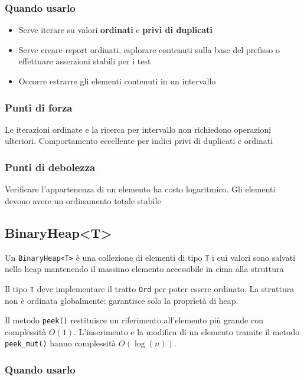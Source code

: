 \subsubsection{Quando usarlo}

\begin{itemize}
  \item Serve iterare su valori \textbf{ordinati} e \textbf{privi di duplicati}
  \item Serve creare report ordinati, esplorare contenuti sulla base del prefisso o effettuare asserzioni stabili per i test
  \item Occorre estrarre gli elementi contenuti in un intervallo
\end{itemize}



\subsubsection{Punti di forza}
Le iterazioni ordinate e la ricerca per intervallo non richiedono operazioni ulteriori.
Comportamento eccellente per indici privi di duplicati e ordinati


\subsubsection{Punti di debolezza}
Verificare l'appartenenza di un elemento ha costo logaritmico.
Gli elementi devono avere un ordinamento totale stabile


\subsection{BinaryHeap<T>}

Un \texttt{BinaryHeap<T>} è una collezione di elementi di tipo \texttt{T} i cui
valori sono salvati nello heap mantenendo il massimo elemento accessibile in
cima alla struttura

Il tipo \texttt{T} deve implementare il tratto \texttt{Ord} per poter essere ordinato.
La struttura non è ordinata globalmente: garantisce solo la proprietà di heap.

Il metodo \texttt{peek()} restituisce un riferimento all'elemento più grande con
complessità $O(1)$.
L'inserimento e la modifica di un elemento tramite il metodo \texttt{peek\_mut()} hanno complessità $O(\log(n))$.


\subsubsection{Quando usarlo}

